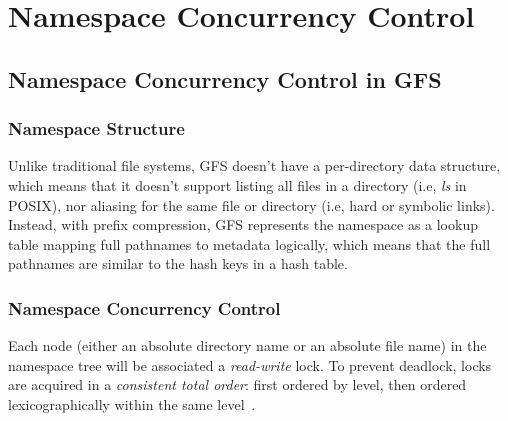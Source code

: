 
%
%


\chapter{Namespace Concurrency Control}
\label{ch:Locking}

%

\section{Namespace Concurrency Control in GFS}

\subsection{Namespace Structure}
Unlike traditional file systems, GFS doesn't have a per-directory data structure, which means that it doesn't support listing all files in a directory (i.e, \textit{ls} in POSIX), nor aliasing for the same file or directory (i.e, hard or symbolic links). Instead, with prefix compression, GFS represents the namespace as a lookup table mapping full pathnames to metadata logically, which means that the full pathnames are similar to the hash keys in a hash table.

\subsection{Namespace Concurrency Control}
Each node (either an absolute directory name or an absolute file name) in the namespace tree will be associated a \textit{read-write} lock. To prevent deadlock, locks are acquired in a \textit{consistent total order}: first ordered by level, then ordered lexicographically within the same level~\cite{ghemawat2003google}.

